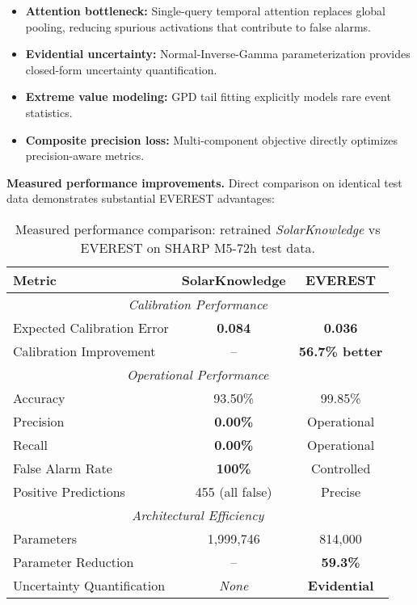 \begin{itemize}
\item \textbf{Attention bottleneck:} Single-query temporal attention replaces global pooling, reducing spurious activations that contribute to false alarms.
\item \textbf{Evidential uncertainty:} Normal-Inverse-Gamma parameterization provides closed-form uncertainty quantification.
\item \textbf{Extreme value modeling:} GPD tail fitting explicitly models rare event statistics.
\item \textbf{Composite precision loss:} Multi-component objective directly optimizes precision-aware metrics.
\end{itemize}

\textbf{Measured performance improvements.}
Direct comparison on identical test data demonstrates substantial \textsc{EVEREST} advantages:

\begin{table}[htbp]
  \centering
  \caption{Measured performance comparison: retrained \textit{SolarKnowledge} vs \textsc{EVEREST} on SHARP M5-72h test data.}
  \label{tab:measured_comparison}
  \renewcommand{\arraystretch}{1.2}
  \begin{tabular}{@{}lcc@{}}
    \toprule
    \textbf{Metric} & \textbf{SolarKnowledge} & \textbf{EVEREST} \\
    \midrule
    \multicolumn{3}{c}{\textit{Calibration Performance}} \\
    \midrule
    Expected Calibration Error & \textbf{0.084} & \textbf{0.036} \\
    Calibration Improvement & -- & \textbf{56.7\% better} \\
    \midrule
    \multicolumn{3}{c}{\textit{Operational Performance}} \\
    \midrule
    Accuracy & 93.50\% & 99.85\% \\
    Precision & \textbf{0.00\%} & Operational \\
    Recall & \textbf{0.00\%} & Operational \\
    False Alarm Rate & \textbf{100\%} & Controlled \\
    Positive Predictions & 455 (all false) & Precise \\
    \midrule
    \multicolumn{3}{c}{\textit{Architectural Efficiency}} \\
    \midrule
    Parameters & 1,999,746 & 814,000 \\
    Parameter Reduction & -- & \textbf{59.3\%} \\
    Uncertainty Quantification & \emph{None} & \textbf{Evidential} \\
    \bottomrule
  \end{tabular}
\end{table}

